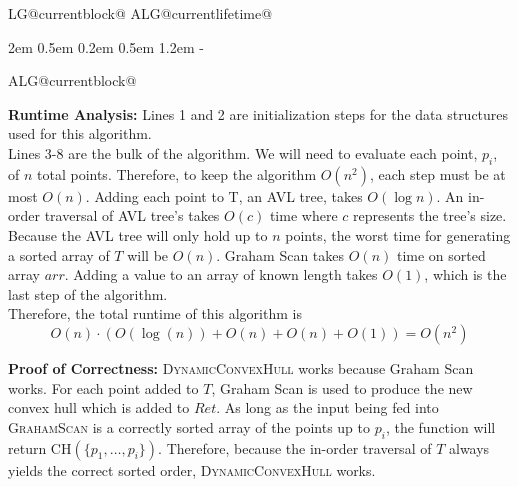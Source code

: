 \documentclass[11pt]{article}
\makeatletter
\newlength{\continueindent}
\renewenvironment{algorithmic}[1][0]%
   {%
   \edef\ALG@numberfreq{#1}%
   \def\@currentlabel{\theALG@line}%
   \setcounter{ALG@line}{0}%
   \setcounter{ALG@rem}{0}%
   \let\\\algbreak%
   \expandafter\edef\csname ALG@currentblock@\theALG@nested\endcsname{0}%
   \expandafter\let\csname ALG@currentlifetime@\theALG@nested\endcsname\relax%
   \begin{list}%
      {\ALG@step}%
      {%
      \rightmargin\z@%
      \itemsep\z@ \itemindent\z@ \listparindent2em%
      \partopsep\z@ \parskip\z@ \parsep\z@%
      \labelsep 0.5em \topsep 0.2em%
      \ifthenelse{\equal{#1}{0}}%
         {\labelwidth 0.5em}%
         {\labelwidth 1.2em}%
       \leftmargin\labelwidth \addtolength{\leftmargin}{\labelsep}
      \ALG@tlm\z@%
      }%
      \parshape 2 \leftmargin \linewidth \continueindent \dimexpr\linewidth-\continueindent\relax
   \setcounter{ALG@nested}{0}%
   \ALG@beginalgorithmic%
   }%
   {%
   \ALG@closeloops%
   \expandafter\ifnum\csname ALG@currentblock@\theALG@nested\endcsname=0\relax%
   \else%
      \PackageError{algorithmicx}{Some blocks are not closed!!!}{}%
   \fi%
   \ALG@endalgorithmic%
   \end{list}%
   }%
\makeatother
\begin{document}
\begin{enumerate}
\begin{minipage}[t]{0.9\textwidth}
\begin{algorithm}[H]
\begin{algorithmic}[1]
\end{algorithmic}
\end{algorithm}
\end{minipage}

\vspace{1em} 

\textbf{Runtime Analysis:} Lines 1 and 2 are initialization steps for the data structures used for this algorithm. \\

Lines 3-8 are the bulk of the algorithm. We will need to evaluate each point, $p_i$, of $n$ total points. Therefore, to keep the algorithm $O(n^2)$, each step must be at most $O(n)$. Adding each point to T, an AVL tree, takes $O(\log n)$. An in-order traversal of AVL tree's takes $O(c)$ time where $c$ represents the tree's size. Because the AVL tree will only hold up to $n$ points, the worst time for generating a sorted array of $T$ will be $O(n)$. Graham Scan takes $O(n)$ time on sorted array $arr$. Adding a value to an array of known length takes $O(1)$, which is the last step of the algorithm. \\

Therefore, the total runtime of this algorithm is \[O(n) \cdot (O(\log(n)) + O(n) + O(n) + O(1)) = O(n^2)\]

\vspace{1em}

\textbf{Proof of Correctness:} \textsc{DynamicConvexHull} works because Graham Scan works. For each point added to $T$, Graham Scan is used to produce the new convex hull which is added to $Ret$. As long as the input being fed into \textsc{GrahamScan} is a correctly sorted array of the points up to $p_i$, the function will return CH$(\{p_1, \dots , p_i\})$. Therefore, because the in-order traversal of $T$ always yields the correct sorted order, \textsc{DynamicConvexHull} works.

\end{enumerate}
\end{document}
